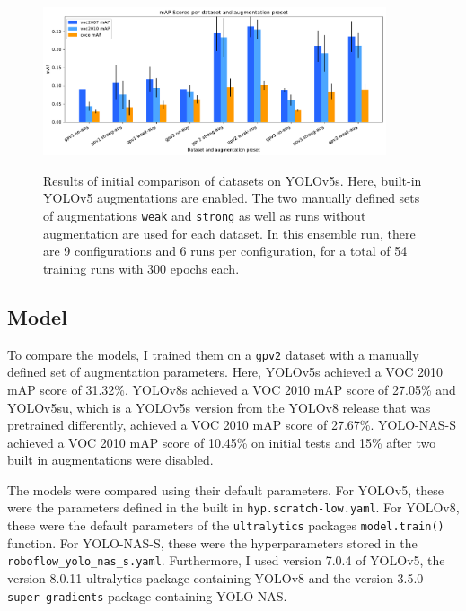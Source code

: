 \documentclass[10pt]{book}
\begin{document}

\begin{figure}
  \caption{Results of initial comparison of datasets on \ac{YOLO}v5s. Here, built-in \ac{YOLO}v5 augmentations are enabled. The two manually defined sets of augmentations \texttt{weak} and \texttt{strong} as well as runs without augmentation are used for each dataset. In this ensemble run, there are 9 configurations and 6 runs per configuration, for a total of 54 training runs with 300 epochs each.}
  \includegraphics[width=0.9\textwidth]{image/gp-compare-v2-thesis}
  \label{fig:initial_dataset_compare}
\end{figure}

\subsection{Model}


To compare the models, I trained them on a \texttt{gpv2} dataset with a manually defined set of augmentation parameters. Here, \ac{YOLO}v5s achieved a VOC 2010 \ac{mAP} score of 31.32\%. \ac{YOLO}v8s achieved a VOC 2010 \ac{mAP} score of 27.05\% and \ac{YOLO}v5su, which is a \ac{YOLO}v5s version from the \ac{YOLO}v8 release that was pretrained differently, achieved a VOC 2010 \ac{mAP} score of 27.67\%. \ac{YOLO}-NAS-S achieved a VOC 2010 \ac{mAP} score of 10.45\% on initial tests and 15\% after two built in augmentations were disabled.

The models were compared using their default parameters. For \ac{YOLO}v5, these were the parameters defined in the built in \texttt{hyp.scratch-low.yaml}. For \ac{YOLO}v8, these were the default parameters of the \texttt{ultralytics} packages \texttt{model.train()} function. For \ac{YOLO}-NAS-S, these were the hyperparameters stored in the \texttt{roboflow\_yolo\_nas\_s.yaml}. Furthermore, I used version 7.0.4 of \ac{YOLO}v5, the version 8.0.11 ultralytics package containing \ac{YOLO}v8 and the version 3.5.0 \texttt{super-gradients} package containing \ac{YOLO}-NAS.
\end{document}
